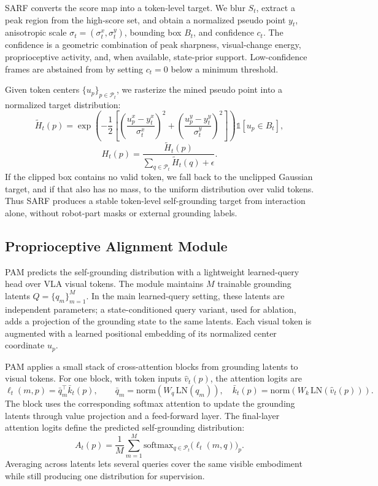 SARF converts the score map into a token-level target. We blur \(S_t\), extract
a peak region from the high-score set, and obtain a normalized pseudo point
\(y_t\), anisotropic scale \(\sigma_t=(\sigma^x_t,\sigma^y_t)\), bounding box
\(B_t\), and confidence \(c_t\). The confidence is a geometric combination of
peak sharpness, visual-change energy, proprioceptive activity, and, when
available, state-prior support. Low-confidence frames are abstained from by
setting \(c_t=0\) below a minimum threshold.

Given token centers \(\{u_p\}_{p\in\mathcal{P}_t}\), we rasterize the mined
pseudo point into a normalized target distribution:
\[
    \tilde{H}_t(p)
    =
    \exp\left(
    -\frac{1}{2}
    \left[
    \left(\frac{u^x_p-y^x_t}{\sigma^x_t}\right)^2
    +
    \left(\frac{u^y_p-y^y_t}{\sigma^y_t}\right)^2
    \right]
    \right)
    \mathbb{1}[u_p\in B_t],
\]
\[
    H_t(p)
    =
    \frac{\tilde{H}_t(p)}
    {\sum_{q\in\mathcal{P}_t}\tilde{H}_t(q)+\epsilon}.
\]
If the clipped box contains no valid token, we fall back to the unclipped
Gaussian target, and if that also has no mass, to the uniform distribution over
valid tokens. Thus SARF produces a stable token-level self-grounding target
from interaction alone, without robot-part masks or external grounding labels.

\subsection{Proprioceptive Alignment Module}

PAM predicts the self-grounding distribution with a lightweight learned-query
head over VLA visual tokens. The module maintains \(M\) trainable grounding
latents \(Q=\{q_m\}_{m=1}^{M}\). In the main learned-query setting, these
latents are independent parameters; a state-conditioned query variant, used for
ablation, adds a projection of the grounding state to the same latents. Each
visual token is augmented with a learned positional embedding of its normalized
center coordinate \(u_p\).

PAM applies a small stack of cross-attention blocks from grounding latents to
visual tokens. For one block, with token inputs \(\hat{v}_t(p)\), the attention
logits are
\[
    \ell_t(m,p)
    =
    \bar{q}_{m}^{\top}\bar{k}_t(p),
    \qquad
    \bar{q}_{m}
    =
    \mathrm{norm}(W_q\,\mathrm{LN}(q_m)),
    \quad
    \bar{k}_t(p)
    =
    \mathrm{norm}(W_k\,\mathrm{LN}(\hat{v}_t(p))).
\]
The block uses the corresponding softmax attention to update the grounding
latents through value projection and a feed-forward layer. The final-layer
attention logits define the predicted self-grounding distribution:
\[
    A_t(p)
    =
    \frac{1}{M}
    \sum_{m=1}^{M}
    \mathrm{softmax}_{q\in\mathcal{P}_t}\bigl(\ell_t(m,q)\bigr)_p .
\]
Averaging across latents lets several queries cover the same visible
embodiment while still producing one distribution for supervision.

